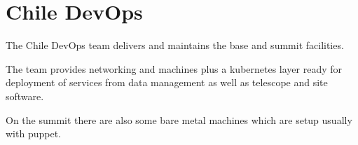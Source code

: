 \section{Chile DevOps} \label{sec:devops}

The Chile DevOps team delivers and maintains the base and summit facilities.

The team provides networking and machines plus a kubernetes layer ready for deployment of services from data management as well as telescope and site software.

On the summit there are also some bare metal machines which are setup usually with puppet.

